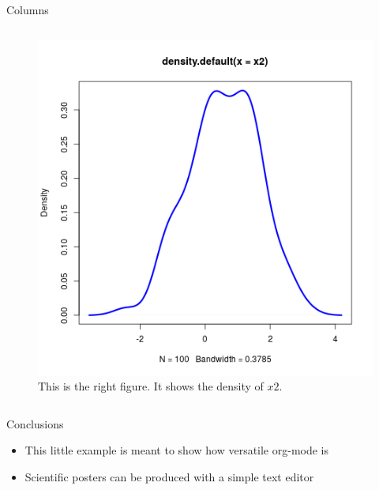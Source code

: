 \documentclass[final]{beamer}
\begin{document}
\begin{frame}[fragile,label={sec:org954d466}]{}
\begin{columns}
\begin{column}[t]{0.45\columnwidth}
\begin{block}{Columns}
\begin{columns}
\begin{column}[T]{0.48\columnwidth}
\captionsetup{justification=justified,width=.85\linewidth}
\begin{figure}[htbp]
\centering
\includegraphics[width=.9\linewidth]{4r.png}
\caption{\label{fig:org5983ee2}
This is the right figure. It shows the density of \(x2\).}
\end{figure}
\end{column}
\end{columns}
\end{block}

\begin{block}{Conclusions}
\begin{itemize}
\item This little example is meant to show how versatile org-mode is
\item Scientific posters can be produced with a simple text editor
\end{itemize}
\end{block}
\end{column}
\end{columns}
\end{frame}
\end{document}
